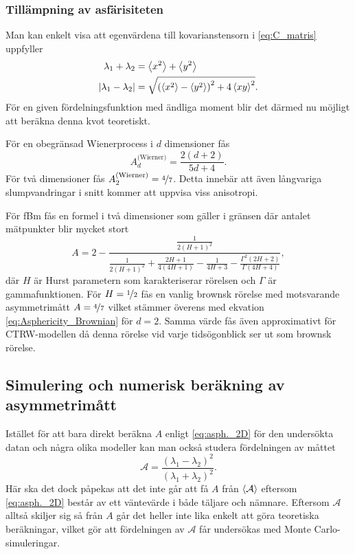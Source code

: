 \subsubsection{Tillämpning av asfärisiteten}
Man kan enkelt visa att egenvärdena till kovarianstensorn i \eqref{eq:C_matris} uppfyller~\cite{Hong_asymmetri1998}
\begin{equation}
\begin{aligned}
    \lambda_1+\lambda_2 &= \ev{x^2}+\ev{y^2} \\
    \abs{\lambda_1-\lambda_2} &= 
        \sqrt{\left(\ev{x^2}-\ev{y^2}\right)^2 + 4\ev{xy}^2}.
\end{aligned}
\end{equation} 
För en given fördelningsfunktion med ändliga moment blir det därmed nu möjligt att beräkna denna kvot teoretiskt.

För en obegränsad Wienerprocess i $d$ dimensioner fås 
\begin{equation} \label{eq:Asphericity_Brownian}
    A_d^\text{(Wierner)}=\frac{2(d+2)}{5d+4}.
\end{equation}
För två dimensioner fås $A_2^\text{(Wierner)}=\nicefrac{4}{7}$. Detta innebär att även långvariga slumpvandringar i snitt kommer att uppvisa viss anisotropi.

För fBm fås en formel i två dimensioner som gäller i gränsen där antalet mätpunkter blir mycket stort ~\cite{Hong_asymmetri1998}
\begin{equation} \label{eq:A_fBm}
A=2-
\frac{\frac{1}{2(H+1)^2}}{\frac{1}{2(H+1)^2}+\frac{2H+1}{4(4H+1)}-\frac{1}{4H+3}-\frac{\Gamma^2(2H+2)}{\Gamma(4H+4)}},
\end{equation}
där $H$ är Hurst parametern som karakteriserar rörelsen och $\Gamma$ är gammafunktionen. För $H=\nicefrac{1}{2}$ fås en vanlig brownsk rörelse med motsvarande  asymmetrimått $A=\nicefrac{4}{7}$ vilket stämmer överens med ekvation \eqref{eq:Asphericity_Brownian} för $d=2$. Samma värde fås även approximativt för CTRW-modellen \cite{Ernst_ACTRW2012} då denna rörelse vid varje tidsögonblick ser ut som brownsk rörelse. 




 
\subsection{Simulering och numerisk beräkning av asymmetrimått} 
Istället för att bara direkt beräkna $A$ enligt \eqref{eq:asph._2D} för den undersökta datan och några olika modeller kan man också studera fördelningen av måttet 
\begin{equation}
\mathcal{A} =
\frac{(\lambda_1 - \lambda_2)^2}{(\lambda_1 + \lambda_2)^2}.
\end{equation}
Här ska det dock påpekas att det inte går att få $A$ från  $\ev{\mathcal{A}}$ eftersom \eqref{eq:asph._2D} består av ett väntevärde i både täljare och nämnare. Eftersom $\mathcal{A}$ alltså skiljer sig så från $A$ går det heller inte lika enkelt att göra teoretiska beräkningar, vilket gör att fördelningen av $\mathcal{A}$ får undersökas med Monte Carlo-simuleringar.


